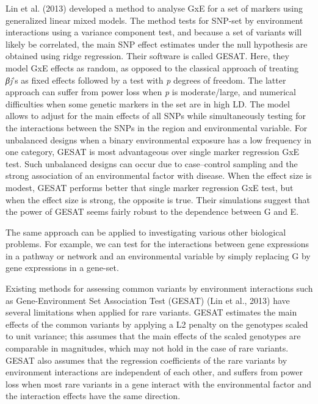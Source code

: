 \documentclass[]{book}
\theoremstyle{definition}
\theoremstyle{definition}
\theoremstyle{definition}
\theoremstyle{remark}
\begin{document}
Lin et al. (2013) developed a method to analyse GxE for a set of markers
using generalized linear mixed models. The method tests for SNP-set by
environment interactions using a variance component test, and because a
set of variants will likely be correlated, the main SNP effect estimates
under the null hypothesis are obtained using ridge regression. Their
software is called GESAT. Here, they model GxE effects as random, as
opposed to the classical approach of treating \emph{βj}'s as fixed
effects followed by a test with \emph{p} degrees of freedom. The latter
approach can suffer from power loss when \emph{p} is moderate/large, and
numerical difficulties when some genetic markers in the set are in high
LD. The model allows to adjust for the main effects of all SNPs while
simultaneously testing for the interactions between the SNPs in the
region and environmental variable. For unbalanced designs when a binary
environmental exposure has a low frequency in one category, GESAT is
most advantageous over single marker regression GxE test. Such
unbalanced designs can occur due to case--control sampling and the
strong association of an environmental factor with disease. When the
effect size is modest, GESAT performs better that single marker
regression GxE test, but when the effect size is strong, the opposite is
true. Their simulations suggest that the power of GESAT seems fairly
robust to the dependence between G and E.

The same approach can be applied to investigating various other
biological problems. For example, we can test for the interactions
between gene expressions in a pathway or network and an environmental
variable by simply replacing G by gene expressions in a gene-set.

Existing methods for assessing common variants by environment
interactions such as Gene-Environment Set Association Test (GESAT) (Lin
et al., 2013) have several limitations when applied for rare variants.
GESAT estimates the main effects of the common variants by applying a L2
penalty on the genotypes scaled to unit variance; this assumes that the
main effects of the scaled genotypes are comparable in magnitudes, which
may not hold in the case of rare variants. GESAT also assumes that the
regression coefficients of the rare variants by environment interactions
are independent of each other, and suffers from power loss when most
rare variants in a gene interact with the environmental factor and the
interaction effects have the same direction.
\end{document}
